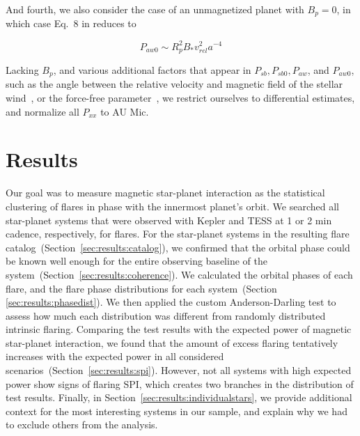 \documentclass[twocolumn]{aastex631}
\begin{document}
And fourth, we also consider the case of an unmagnetized planet with $B_p=0$, in which case Eq.~8 in \cite{kavanagh2022radio} reduces to

\begin{equation}
    P_{aw0} \sim R_p^2  B_*  v_{rel}^2  a^{-4}
\end{equation}

Lacking $B_p$, and various additional factors that appear in $P_{sb},P_{sb0},P_{aw}$, and  $P_{aw0}$, such as the angle between the relative velocity and magnetic field of the stellar wind~\citep{kavanagh2022radio}, or the force-free parameter~\citep{lanza2012starplanet}, we restrict ourselves to differential estimates, and normalize all $P_{xx}$ to AU Mic.

\section{Results}
\label{sec:results}

Our goal was to measure magnetic star-planet interaction as the statistical clustering of flares in phase with the innermost planet's orbit. We searched all star-planet systems that were observed with Kepler and TESS at 1 or 2 min cadence, respectively, for flares. For the star-planet systems in the resulting flare catalog~(Section~\ref{sec:results:catalog}), we confirmed that the orbital phase could be known well enough for the entire observing baseline of the system~(Section~\ref{sec:results:coherence}). We calculated the orbital phases of each flare, and the flare phase distributions for each system~(Section \ref{sec:results:phasedist}). We then applied the custom Anderson-Darling test to assess how much each distribution was different from randomly distributed intrinsic flaring. Comparing the test results with the expected power of magnetic star-planet interaction, we found that the amount of excess flaring tentatively increases with the expected power in all considered scenarios~(Section~\ref{sec:results:spi}). However, not all systems with high expected power show signs of flaring SPI, which creates two branches in the distribution of test results. Finally, in Section~\ref{sec:results:individualstars}, we provide additional context for the most interesting systems in our sample, and explain why we had to exclude others from the analysis.
\end{document}
